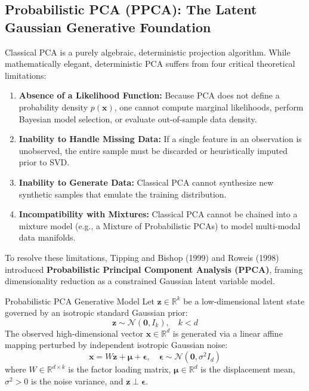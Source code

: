 \subsection{Probabilistic PCA (PPCA): The Latent Gaussian Generative Foundation}
Classical PCA is a purely algebraic, deterministic projection algorithm. While mathematically elegant, deterministic PCA suffers from four critical theoretical limitations:
\begin{enumerate}
    \item \textbf{Absence of a Likelihood Function:} Because PCA does not define a probability density $p(\mathbf{x})$, one cannot compute marginal likelihoods, perform Bayesian model selection, or evaluate out-of-sample data density.
    \item \textbf{Inability to Handle Missing Data:} If a single feature in an observation is unobserved, the entire sample must be discarded or heuristically imputed prior to SVD.
    \item \textbf{Inability to Generate Data:} Classical PCA cannot synthesize new synthetic samples that emulate the training distribution.
    \item \textbf{Incompatibility with Mixtures:} Classical PCA cannot be chained into a mixture model (e.g., a Mixture of Probabilistic PCAs) to model multi-modal data manifolds.
\end{enumerate}

To resolve these limitations, Tipping and Bishop (1999) and Roweis (1998) introduced \textbf{Probabilistic Principal Component Analysis (PPCA)}, framing dimensionality reduction as a constrained Gaussian latent variable model.

\begin{definitionbox}{Probabilistic PCA Generative Model}
Let $\mathbf{z} \in \mathbb{R}^k$ be a low-dimensional latent state governed by an isotropic standard Gaussian prior:
\begin{equation}
\mathbf{z} \sim \mathcal{N}(\mathbf{0}, I_k), \quad k < d
\label{eq:ppca_prior}
\end{equation}
The observed high-dimensional vector $\mathbf{x} \in \mathbb{R}^d$ is generated via a linear affine mapping perturbed by independent isotropic Gaussian noise:
\begin{equation}
\mathbf{x} = W \mathbf{z} + \boldsymbol{\mu} + \boldsymbol{\epsilon}, \quad \boldsymbol{\epsilon} \sim \mathcal{N}(\mathbf{0}, \sigma^2 I_d)
\label{eq:ppca_generative}
\end{equation}
where $W \in \mathbb{R}^{d \times k}$ is the factor loading matrix, $\boldsymbol{\mu} \in \mathbb{R}^d$ is the displacement mean, $\sigma^2 > 0$ is the noise variance, and $\mathbf{z} \perp \boldsymbol{\epsilon}$.
\end{definitionbox}

